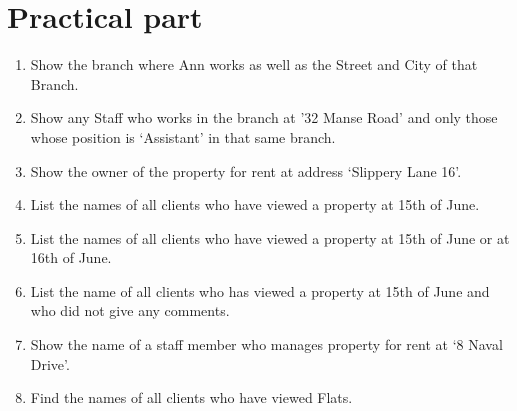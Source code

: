 \documentclass[12pt,a4paper]{article}
\begin{document}
\section{Practical part}
\begin{enumerate}
\item Show the branch where Ann works as well as the Street and City
of that Branch.
\item Show any Staff who works in the branch at ’32 Manse Road’ and only those
whose position is ‘Assistant’ in that same branch.
\item Show the owner of the property for rent at address ‘Slippery Lane 16’.
\item List the names of all clients who have viewed a property at 15th of June.
\item List the names of all clients who have viewed a property at 15th of June or
at 16th of June.
\item List the name of all clients who has viewed a property at 15th of June and
who did not give any comments.
\item Show the name of a staff member who manages property for rent at ‘8
Naval Drive’.
\item Find the names of all clients who have viewed Flats.
\end{enumerate}	
\end{document}

